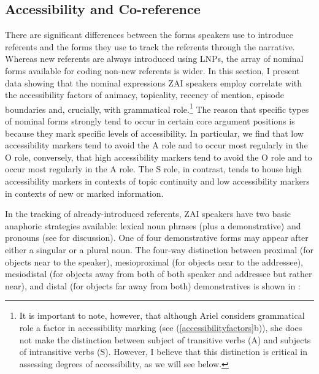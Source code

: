 \subsection{Accessibility and Co-reference}

There are significant differences between the forms speakers use to introduce referents and the forms they use to track the referents through the narrative. Whereas new referents are always introduced using LNPs, the array of nominal forms available for coding non-new referents is wider. In this section, I present data showing that the nominal expressions ZAI speakers employ correlate with the accessibility factors of animacy, topicality, recency of mention, episode boundaries and, crucially, with grammatical role.\footnote{It is important to note, however, that although Ariel considers grammatical role a factor in accessibility marking (see (\ref{accessibilityfactors}b)), she does not make the distinction between subject of transitive verbs (A) and subjects of intransitive verbs (S). However, I believe that this distinction is critical in assessing degrees of accessibility, as we will see below.} The reason that specific types of nominal forms strongly tend to occur in certain core argument positions is because they mark specific levels of accessibility. In particular, we find that low accessibility markers tend to avoid the A role and to occur most regularly in the O role, conversely, that high accessibility markers tend to avoid the O role and to occur most regularly in the A role. The S role, in contrast, tends to house high accessibility markers in contexts of topic continuity and low accessibility markers in contexts of new or marked information.


In the tracking of already-introduced referents, ZAI speakers have two basic anaphoric strategies available: lexical noun phrases (plus a demonstrative) and pronouns (see  for discussion). One of four demonstrative forms may appear after either a singular or a plural noun. The four-way distinction between proximal (for objects near to the speaker), mesioproximal (for objects near to the addressee), mesiodistal (for objects away from both of both speaker and addressee but rather near), and distal (for objects far away from both) demonstratives is shown in : 
 
